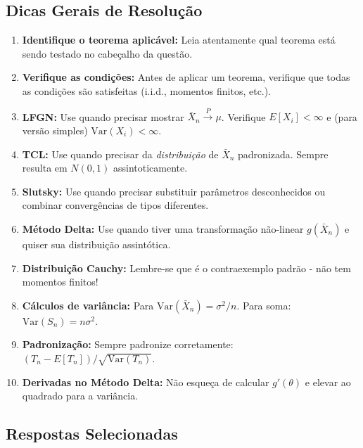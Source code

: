 \documentclass[12pt,a4paper]{article}
\begin{document}
\subsection{Dicas Gerais de Resolução}

\begin{enumerate}
    \item \textbf{Identifique o teorema aplicável:} Leia atentamente qual teorema está sendo testado no cabeçalho da questão.
    
    \item \textbf{Verifique as condições:} Antes de aplicar um teorema, verifique que todas as condições são satisfeitas (i.i.d., momentos finitos, etc.).
    
    \item \textbf{LFGN:} Use quando precisar mostrar $\bar{X}_n \xrightarrow{P} \mu$. Verifique $E[X_i] < \infty$ e (para versão simples) $\text{Var}(X_i) < \infty$.
    
    \item \textbf{TCL:} Use quando precisar da \emph{distribuição} de $\bar{X}_n$ padronizada. Sempre resulta em $N(0,1)$ assintoticamente.
    
    \item \textbf{Slutsky:} Use quando precisar substituir parâmetros desconhecidos ou combinar convergências de tipos diferentes.
    
    \item \textbf{Método Delta:} Use quando tiver uma transformação não-linear $g(\bar{X}_n)$ e quiser sua distribuição assintótica.
    
    \item \textbf{Distribuição Cauchy:} Lembre-se que é o contraexemplo padrão - não tem momentos finitos!
    
    \item \textbf{Cálculos de variância:} Para $\text{Var}(\bar{X}_n) = \sigma^2/n$. Para soma: $\text{Var}(S_n) = n\sigma^2$.
    
    \item \textbf{Padronização:} Sempre padronize corretamente: $(T_n - E[T_n])/\sqrt{\text{Var}(T_n)}$.
    
    \item \textbf{Derivadas no Método Delta:} Não esqueça de calcular $g'(\theta)$ e elevar ao quadrado para a variância.
\end{enumerate}

\subsection{Respostas Selecionadas}
\end{document}
